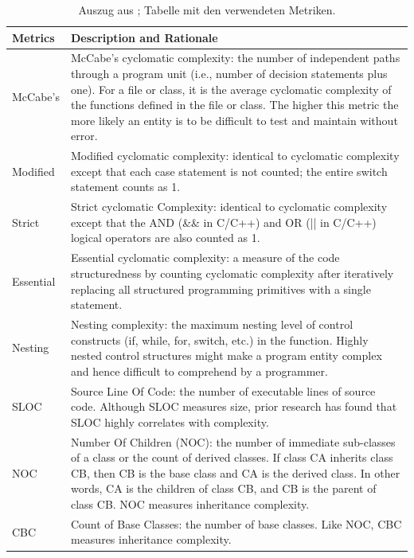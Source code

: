 \begin{table}
	\caption{Auszug aus \cite{chowdhury_zulkernine_2010}; Tabelle mit den verwendeten Metriken.}
	\label{table1}
	\begin{tabular}{|p{1.6cm}|p{10.4cm}|}
		\hline
		Metrics & Description and Rationale  \\
		\hline
		McCabe's & McCabe's cyclomatic complexity: the number of independent paths through a program unit (i.e., number of decision statements plus one).
		For a file or class, it is the average cyclomatic complexity of the functions defined in the file or class. The higher this metric the more likely
		an entity is to be difficult to test and maintain without error.\\
		\hline
		Modified & Modified cyclomatic complexity: identical to cyclomatic complexity except that each case statement is not counted; the entire switch statement counts as 1.\\
		\hline
		Strict & Strict cyclomatic Complexity: identical to cyclomatic complexity except that the AND (\&\& in C/C++) and OR (|| in C/C++) logical operators are also counted as 1.\\
		\hline
		Essential & Essential cyclomatic complexity: a measure of the code structuredness by counting cyclomatic complexity after iteratively replacing all structured programming primitives with a single statement.\\
		\hline
		Nesting & Nesting complexity: the maximum nesting level of control constructs (if, while, for, switch, etc.) in the function. Highly nested control	structures might make a program entity complex and hence difficult to comprehend by a programmer.\\
		\hline
		SLOC & Source Line Of Code: the number of executable lines of source code. Although SLOC measures size, prior research has found that SLOC highly correlates with complexity.\\
		\hline
		NOC & Number Of Children (NOC): the number of immediate sub-classes of a class or the count of derived classes. If class CA inherits class CB, then	CB is the base class and CA is the derived class. In other words, CA is the children of class CB, and CB is the parent of class CB. NOC measures inheritance complexity.\\
		\hline
		CBC & Count of Base Classes: the number of base classes. Like NOC, CBC measures inheritance complexity.\\
		\hline
	\end{tabular}
\end{table}

